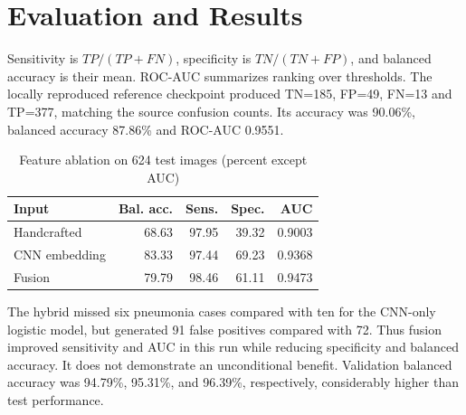 \documentclass[conference]{IEEEtran}
\begin{document}
\section{Evaluation and Results}
Sensitivity is $TP/(TP+FN)$, specificity is $TN/(TN+FP)$, and balanced accuracy is their mean. ROC-AUC summarizes ranking over thresholds. The locally reproduced reference checkpoint produced TN=185, FP=49, FN=13 and TP=377, matching the source confusion counts. Its accuracy was 90.06\%, balanced accuracy 87.86\% and ROC-AUC 0.9551.
\begin{table}[htbp]
\caption{Feature ablation on 624 test images (percent except AUC)}
\centering\small
\begin{tabular}{lrrrr}\toprule
Input & Bal. acc. & Sens. & Spec. & AUC\\\midrule
Handcrafted & 68.63 & 97.95 & 39.32 & 0.9003\\
CNN embedding & 83.33 & 97.44 & 69.23 & 0.9368\\
Fusion & 79.79 & 98.46 & 61.11 & 0.9473\\\bottomrule
\end{tabular}
\end{table}
The hybrid missed six pneumonia cases compared with ten for the CNN-only logistic model, but generated 91 false positives compared with 72. Thus fusion improved sensitivity and AUC in this run while reducing specificity and balanced accuracy. It does not demonstrate an unconditional benefit. Validation balanced accuracy was 94.79\%, 95.31\%, and 96.39\%, respectively, considerably higher than test performance.
\end{document}
